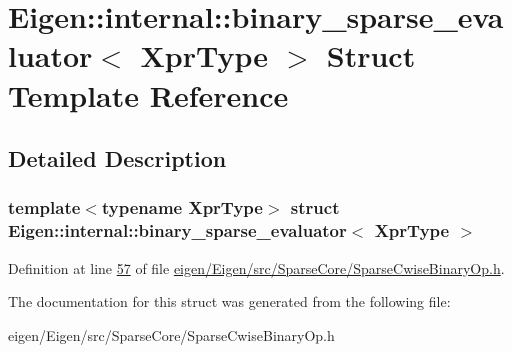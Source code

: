 \hypertarget{struct_eigen_1_1internal_1_1binary__sparse__evaluator}{}\section{Eigen\+:\+:internal\+:\+:binary\+\_\+sparse\+\_\+evaluator$<$ Xpr\+Type $>$ Struct Template Reference}
\label{struct_eigen_1_1internal_1_1binary__sparse__evaluator}


\subsection{Detailed Description}
\subsubsection*{template$<$typename Xpr\+Type$>$\newline
struct Eigen\+::internal\+::binary\+\_\+sparse\+\_\+evaluator$<$ Xpr\+Type $>$}



Definition at line \hyperlink{eigen_2_eigen_2src_2_sparse_core_2_sparse_cwise_binary_op_8h_source_l00057}{57} of file \hyperlink{eigen_2_eigen_2src_2_sparse_core_2_sparse_cwise_binary_op_8h_source}{eigen/\+Eigen/src/\+Sparse\+Core/\+Sparse\+Cwise\+Binary\+Op.\+h}.



The documentation for this struct was generated from the following file\+:\begin{DoxyCompactItemize}
\item 
eigen/\+Eigen/src/\+Sparse\+Core/\+Sparse\+Cwise\+Binary\+Op.\+h\end{DoxyCompactItemize}
